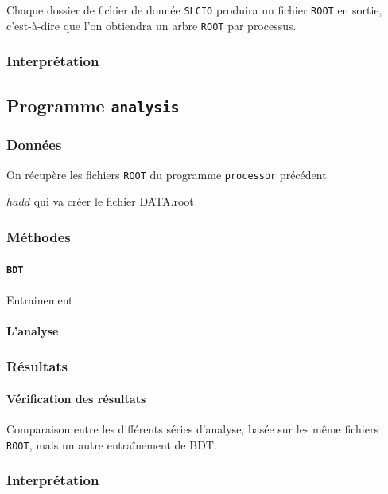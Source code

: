 \documentclass[10pt,a4paper]{report}
\newcommand{\cad}{c'est-à-dire\xspace}
\newcommand{\ROOT}{\texttt{ROOT}\xspace}
\newcommand{\SLCIO}{\texttt{SLCIO}\xspace}
\newcommand{\processor}{\texttt{processor}\xspace}
\newcommand{\analysis}{\texttt{analysis}\xspace}
\begin{document}
Chaque dossier de fichier de donnée \SLCIO produira un fichier \ROOT en sortie, \cad que l'on obtiendra un arbre \ROOT par processus.


\subsubsection{Interprétation}

\subsection{Programme \analysis}

\subsubsection{Données}

On récupère les fichiers \ROOT du programme \processor précédent. 

$ hadd $ qui va créer le fichier DATA.root

\subsubsection{Méthodes}

\paragraph{\texttt{BDT}}

Entrainement

\paragraph{L'analyse}


\subsubsection{Résultats}

\paragraph{Vérification des résultats}
Comparaison entre les différents séries d'analyse, basée sur les même fichiers \ROOT, mais un autre entraînement de BDT.

\subsubsection{Interprétation}
\end{document}
